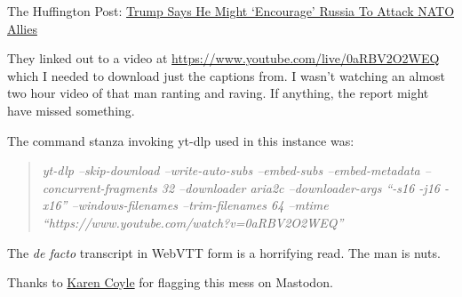 The Huffington Post:
\href{https://www.huffingtonpost.co.uk/entry/trump-russia-attack-nato-allies_n_65c7e443e4b069b665dfb762}{Trump
Says He Might `Encourage' Russia To Attack NATO Allies}

They linked out to a video at
\url{https://www.youtube.com/live/0aRBV2O2WEQ} which I needed to
download just the captions from. I wasn't watching an almost two hour
video of that man ranting and raving. If anything, the report might have
missed something.

The command stanza invoking yt-dlp used in this instance was:

\begin{quote}
\emph{yt-dlp --skip-download --write-auto-subs --embed-subs
--embed-metadata --concurrent-fragments 32 --downloader aria2c
--downloader-args ``-s16 -j16 -x16'' --windows-filenames
--trim-filenames 64 --mtime
``https://www.youtube.com/watch?v=0aRBV2O2WEQ''}
\end{quote}

The \emph{de facto} transcript in WebVTT form is a horrifying read. The
man is nuts.

Thanks to \href{https://mstdn.social/@kcoyle}{Karen Coyle} for flagging
this mess on Mastodon.
